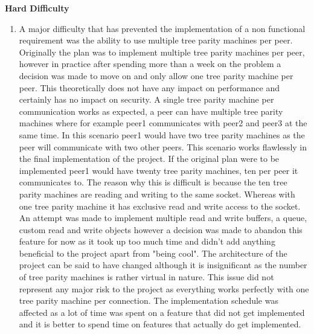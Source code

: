 \textbf{Hard Difficulty}
\begin{enumerate}
\item A major difficulty that has prevented the implementation of a non functional requirement was the ability to use multiple tree parity machines per peer. Originally the plan was to implement multiple tree parity machines per peer, however in practice after spending more than a week on the problem a decision was made to move on and only allow one tree parity machine per peer. This theoretically does not have any impact on performance and certainly has no impact on security. A single tree parity machine per communication works as expected, a peer can have multiple tree parity machines where for example peer1 communicates with peer2 and peer3 at the same time. In this scenario peer1 would have two tree parity machines as the peer will communicate with two other peers. This scenario works flawlessly in the final implementation of the project. If the original plan were to be implemented peer1 would have twenty tree parity machines, ten per peer it communicates to. The reason why this is difficult is because the ten tree parity machines are reading and writing to the same socket. Whereas with one tree parity machine it has exclusive read and write access to the socket. An attempt was made to implement multiple read and write buffers, a queue, custom read and write objects however a decision was made to abandon this feature for now as it took up too much time and didn't add anything beneficial to the project apart from "being cool". 
The architecture of the project can be said to have changed although it is insignificant as the number of tree parity machines is rather virtual in nature. This issue did not represent any major risk to the project as everything works perfectly with one tree parity machine per connection. The implementation schedule was affected as a lot of time was spent on a feature that did not get implemented and it is better to spend time on features that actually do get implemented.
\end{enumerate}



